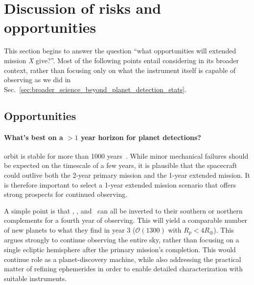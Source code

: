 \section{Discussion of risks and opportunities} 
\label{sec:risks_opps}
This section begins to answer the question ``what opportunities will extended mission \textit{X} give?''.
Most of the following points entail considering \tess in its broader context, rather than focusing only on what the \tess instrument itself is capable of observing as we did in Sec.~\ref{sec:broader_science_beyond_planet_detection_stats}.


\subsection{Opportunities}
\paragraph{What's best on a $>1$ year horizon for planet detections?}
\tesss orbit is stable for more than 1000 years~\citep{gangestad_high_2013}.
While minor mechanical failures should be expected on the timescale of a few years, it is plausible that the spacecraft could outlive both the 2-year primary mission and the 1-year extended mission.
It is therefore important to select a 1-year extended mission scenario that offers strong prospects for continued observing.

A simple point is that \nhemi, \npole, and \shemiAvoid\ can all be inverted to their southern or northern complements for a fourth year of observing.
This will yield a comparable number of new planets to what they find in year 3 ($\mathcal{O}(1300)$ with $R_p<4R_\oplus$).
This argues strongly to continue observing the entire sky, rather than focusing on a single ecliptic hemisphere after the primary mission's completion.
This would continue \tesss role as a planet-discovery machine, while also addressing the practical matter of refining ephemerides in order to enable detailed characterization with suitable instruments.

